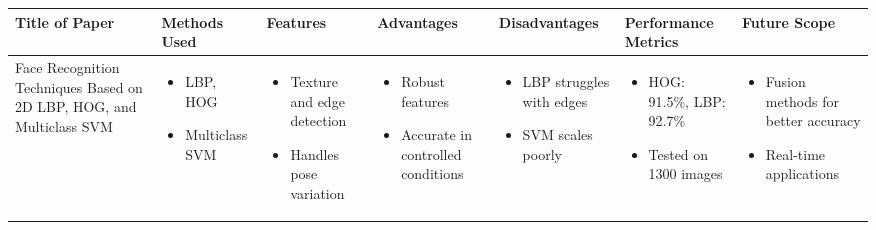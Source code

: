 \documentclass{article}
\begin{document}
\small
\begin{adjustbox}{width=\textwidth}
\begin{tabular}{|p{}|p{}|p{}|p{}|p{}|p{}|p{}|}
    \hline
    \rowcolor[HTML]{D3D3D3}
    \textbf{Title of Paper} & \textbf{Methods Used} & \textbf{Features} & \textbf{Advantages} & \textbf{Disadvantages} & \textbf{Performance Metrics} & \textbf{Future Scope} \\
    
    \hline
    Face Recognition Techniques Based on 2D LBP, HOG, and Multiclass SVM & 
    \begin{itemize}[leftmargin=*]
        \item LBP, HOG
        \item Multiclass SVM
    \end{itemize} & 
    \begin{itemize}[leftmargin=*]
        \item Texture and edge detection
        \item Handles pose variation
    \end{itemize} & 
    \begin{itemize}[leftmargin=*]
        \item Robust features
        \item Accurate in controlled conditions
    \end{itemize} & 
    \begin{itemize}[leftmargin=*]
        \item LBP struggles with edges
        \item SVM scales poorly
    \end{itemize} & 
    \begin{itemize}[leftmargin=*]
        \item HOG: 91.5\%, LBP: 92.7\%
        \item Tested on 1300 images
    \end{itemize} & 
    \begin{itemize}[leftmargin=*]
        \item Fusion methods for better accuracy
        \item Real-time applications
    \end{itemize} \\
    

\end{tabular}
\end{adjustbox}
\end{document}
